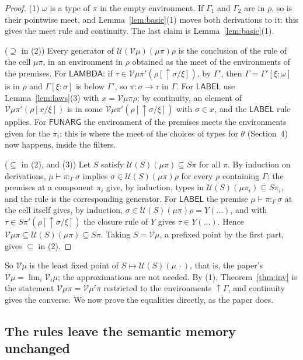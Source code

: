 \documentclass[11pt]{amsart}
\theoremstyle{definition}
\theoremstyle{remark}
\newcommand{\kw}[1]{\mathsf{#1}}
\newcommand{\obs}[4]{#1\vdash #2:_{#3}#4}
\newcommand{\V}{\mathcal V}
\newcommand{\U}{\mathcal U}
\newcommand{\up}{{\uparrow}}
\begin{document}
\begin{proof}
(1) $\omega$ is a type of $\pi$ in the empty environment. If $\Gamma_1$ and
$\Gamma_2$ are in $\rho$, so is their pointwise meet, and
Lemma~\ref{lem:basic}(1) moves both derivations to it: this gives the meet
rule and continuity. The last claim is Lemma~\ref{lem:basic}(1).

($\supseteq$ in (2)) Every generator of $\U(\V\mu)(\mu\pi)\rho$ is the
conclusion of the rule of the cell $\mu\pi$, in an environment in $\rho$
obtained as the meet of the environments of the premises. For
$\kw{LAMBDA}$: if $\tau\in\V\mu\pi'(\rho[\up\sigma/\xi])$, by $\Gamma'$, then
$\Gamma=\Gamma'[\xi:\omega]$ is in $\rho$ and $\Gamma[\xi:\sigma]$ is below
$\Gamma'$, so $\pi:\sigma\to\tau$ in $\Gamma$. For $\kw{LABEL}$ use
Lemma~\ref{lem:laws}(3) with $x=\V\mu\pi\rho$: by continuity, an element of
$\V\mu\pi'(\rho[x/\xi])$ is in some $\V\mu\pi'(\rho[\up\sigma/\xi])$ with
$\sigma\in x$, and the $\kw{LABEL}$ rule applies. For $\kw{FUNARG}$ the
environment of the premises meets the environments given for the
$\pi_i$; this is where the meet of the choices of types for $\theta$
(Section~4) now happens, inside the filters.

($\subseteq$ in (2), and (3)) Let $S$ satisfy $\U(S)(\mu\pi)\subseteq S\pi$
for all $\pi$. By induction on derivations, $\obs\mu\pi\Gamma\sigma$ implies
$\sigma\in\U(S)(\mu\pi)\rho$ for every $\rho$ containing $\Gamma$: the
premises at a component $\pi_i$ give, by induction, types in
$\U(S)(\mu\pi_i)\subseteq S\pi_i$, and the rule is the corresponding
generator. For $\kw{LABEL}$ the premise $\obs\mu\pi\Gamma\sigma$ at the cell
itself gives, by induction, $\sigma\in\U(S)(\mu\pi)\rho=Y(\dots)$, and with
$\tau\in S\pi'(\rho[\up\sigma/\xi])$ the closure rule of $Y$ gives
$\tau\in Y(\dots)$. Hence $\V\mu\pi\subseteq\U(S)(\mu\pi)\subseteq S\pi$.
Taking $S=\V\mu$, a prefixed point by the first part, gives $\subseteq$
in (2).
\end{proof}

So $\V\mu$ is the least fixed point of $S\mapsto\U(S)(\mu\,\cdot)$, that is,
the paper's $\V\mu=\lim_i\V_i\mu$; the approximations are not needed. By
(1), Theorem~\ref{thm:inv} is the statement $\V\mu\pi=\V\mu'\pi$ restricted to
the environments $\up\Gamma$, and continuity gives the converse. We now prove
the equalities directly, as the paper does.

\subsection{The rules leave the semantic memory unchanged}
\end{document}

